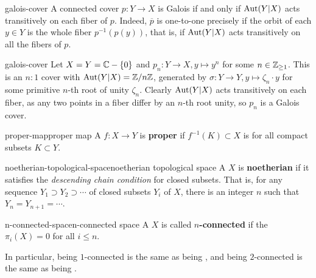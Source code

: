 \begin{example}{galois-cover}
    A connected cover $p : Y \to X$ is Galois if and only if $\textup{Aut}(Y|X)$ acts transitively on each fiber of $p$. Indeed, $\overline{p}$ is one-to-one precisely if the orbit of each $y \in Y$ is the whole fiber $p^{-1}(p(y))$, that is, if $\textup{Aut}(Y|X)$ acts transitively on all the fibers of $p$.
\end{example}

\begin{example}{galois-cover}
    Let $X = Y = \mathbb{C} - \{ 0 \}$ and $p_n : Y \to X, y \mapsto y^n$ for some $n \in \mathbb{Z}_{\ge 1}$. This is an $n : 1$ cover with $\textup{Aut}(Y|X) = \mathbb{Z}/n\mathbb{Z}$, generated by $\sigma : Y \to Y, y \mapsto \zeta_n \cdot y$ for some primitive $n$-th root of unity $\zeta_n$. Clearly $\textup{Aut}(Y|X)$ acts transitively on each fiber, as any two points in a fiber differ by an $n$-th root unity, so $p_n$ is a Galois cover.
\end{example}

\begin{topic}{proper-map}{proper map}
    A  $f : X \to Y$ is \textbf{proper} if $f^{-1}(K) \subset X$ is  for all compact subsets $K \subset Y$.
\end{topic}

\begin{topic}{noetherian-topological-space}{noetherian topological space}
    A  $X$ is \textbf{noetherian} if it satisfies the \textit{descending chain condition} for closed subsets. That is, for any sequence $Y_1 \supset Y_2 \supset \cdots$ of closed subsets $Y_i$ of $X$, there is an integer $n$ such that $Y_n = Y_{n + 1} = \cdots$.
\end{topic}

\begin{topic}{n-connected-space}{n-connected space}
    A  $X$ is called \textbf{$n$-connected} if the  $\pi_i(X) = 0$ for all $i \le n$.
    
    In particular, being $1$-connected is the same as being , and being $2$-connected is the same as being .
\end{topic}

